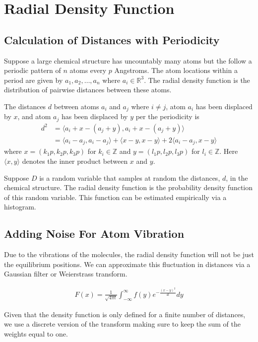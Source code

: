 \documentclass[12pt,letterpaper]{article}
\begin{document}
\setlength{\parindent}{0.25in}
\setlength{\floatsep}{0in}
\section{Radial Density Function}
\subsection{Calculation of Distances with Periodicity}
Suppose a large chemical structure has uncountably many atoms but the follow a
periodic pattern of $n$ atoms every $p$ Angstroms. The atom locations within a
period are given by $a_1, a_2, \ldots, a_n$ where $a_i \in \mathbb{R}^3$. The
radial density function is the distribution of pairwise distances between these
atoms.

The distances $d$ between atoms $a_i$ and $a_j$ where $i \neq j$, atom $a_i$
has been displaced by $x$, and atom $a_j$ has been displaced by $y$ per the
periodicity is 
\begin{align*}
  d^2 &= \langle a_i + x - (a_j + y), a_i + x - (a_j + y) \rangle \\
      &= \langle a_i-a_j, a_i-a_j \rangle  + \langle x-y, x-y \rangle  
      + 2 \langle a_i-a_j,x-y \rangle 
\end{align*}
where $x =(k_1 p, k_2 p, k_3 p)$ for $k_i \in \mathbb{Z}$ 
and $y = (l_1 p, l_2 p, l_3 p)$ for $l_i \in \mathbb{Z}$.
Here $\langle x,y \rangle $ denotes the inner product between $x$ and $y$. 

Suppose $D$ is a random variable that samples at random the distances, $d$, in
the chemical structure. The radial density function is the probability density
function of this random variable. This function can be estimated empirically via
a histogram.

\subsection{Adding Noise For Atom Vibration}
Due to the vibrations of the molecules, the radial density function will not be
just the equilibrium positions. We can approximate this fluctuation in distances
via a Gaussian filter or Weierstrass transform.

\begin{align*}
F(x)=\frac{1}{\sqrt{4\pi t}} 
  \int_{-\infty}^\infty f(y) e^{-\frac{(x-y)^2}{4t}} dy
\end{align*}

Given that the density function is only defined for a finite number of
distances, we use a discrete version of the transform making sure to keep the
sum of the weights equal to one.
\end{document}
